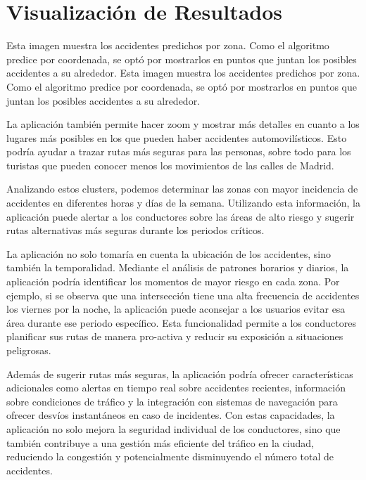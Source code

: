 \section{Visualización de Resultados}
Esta imagen muestra los accidentes predichos por zona. Como el algoritmo predice por coordenada, se optó por mostrarlos en puntos que juntan los posibles accidentes a su alrededor.
Esta imagen muestra los accidentes predichos por zona. Como el algoritmo predice por coordenada, se optó por mostrarlos en puntos que juntan los posibles accidentes a su alrededor.

La aplicación también permite hacer zoom y mostrar más detalles en cuanto a los lugares más posibles en los que pueden haber accidentes automovilísticos. Esto podría ayudar a trazar rutas más seguras para las personas, sobre todo para los turistas que pueden conocer menos los movimientos de las calles de Madrid.

Analizando estos clusters, podemos determinar las zonas con mayor incidencia de accidentes en diferentes horas y días de la semana. Utilizando esta información, la aplicación puede alertar a los conductores sobre las áreas de alto riesgo y sugerir rutas alternativas más seguras durante los periodos críticos.

La aplicación no solo tomaría en cuenta la ubicación de los accidentes, sino también la temporalidad. Mediante el análisis de patrones horarios y diarios, la aplicación podría identificar los momentos de mayor riesgo en cada zona. Por ejemplo, si se observa que una intersección tiene una alta frecuencia de accidentes los viernes por la noche, la aplicación puede aconsejar a los usuarios evitar esa área durante ese periodo específico. Esta funcionalidad permite a los conductores planificar sus rutas de manera pro-activa y reducir su exposición a situaciones peligrosas.


Además de sugerir rutas más seguras, la aplicación podría ofrecer características adicionales como alertas en tiempo real sobre accidentes recientes, información sobre condiciones de tráfico y la integración con sistemas de navegación para ofrecer desvíos instantáneos en caso de incidentes. Con estas capacidades, la aplicación no solo mejora la seguridad individual de los conductores, sino que también contribuye a una gestión más eficiente del tráfico en la ciudad, reduciendo la congestión y potencialmente disminuyendo el número total de accidentes.
